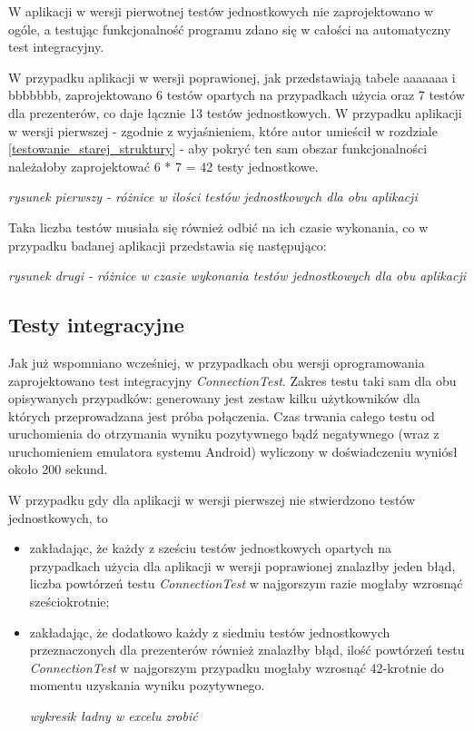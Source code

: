 W aplikacji w wersji pierwotnej testów jednostkowych nie zaprojektowano w ogóle, a testując funkcjonalność programu zdano się w całości na automatyczny test integracyjny. 

W przypadku aplikacji w wersji poprawionej, jak przedstawiają tabele aaaaaaa i bbbbbbb, zaprojektowano 6 testów opartych na przypadkach użycia oraz 7 testów dla prezenterów, co daje łącznie 13 testów jednostkowych. W przypadku aplikacji w wersji pierwszej - zgodnie z wyjaśnieniem, które autor umieścił w rozdziale \ref{testowanie_starej_struktury} - aby pokryć ten sam obszar funkcjonalności należałoby zaprojektować 6 * 7 = 42 testy jednostkowe.

\textit{rysunek pierwszy - różnice w ilości testów jednostkowych dla obu aplikacji}

Taka liczba testów musiała się również odbić na ich czasie wykonania, co w przypadku badanej aplikacji przedstawia się następująco:

\textit{rysunek drugi - różnice w czasie wykonania testów jednostkowych dla obu aplikacji}
 
\subsection{Testy integracyjne}
Jak już wspomniano wcześniej, w przypadkach obu wersji oprogramowania zaprojektowano test integracyjny \textit{ConnectionTest}. Zakres testu taki sam dla obu opisywanych przypadków: generowany jest zestaw kilku użytkowników dla których przeprowadzana jest próba połączenia. Czas trwania całego testu od uruchomienia do otrzymania wyniku pozytywnego bądź negatywnego (wraz z uruchomieniem emulatora systemu Android) wyliczony w doświadczeniu wyniósł około 200 sekund. 

W przypadku gdy dla aplikacji w wersji pierwszej nie stwierdzono testów jednostkowych, to
\begin{itemize}
\item
zakładając, że każdy z sześciu testów jednostkowych opartych na przypadkach użycia dla aplikacji w wersji poprawionej znalazłby jeden błąd, liczba powtórzeń testu \textit{ConnectionTest} w najgorszym razie mogłaby wzrosnąć sześciokrotnie;
\item
zakładając, że dodatkowo każdy z siedmiu testów jednostkowych przeznaczonych dla prezenterów również znalazłby błąd, ilość powtórzeń testu \textit{ConnectionTest} w najgorszym przypadku mogłaby wzrosnąć 42-krotnie do momentu uzyskania wyniku pozytywnego.

\textit{wykresik ładny w excelu zrobić}
\end{itemize}

